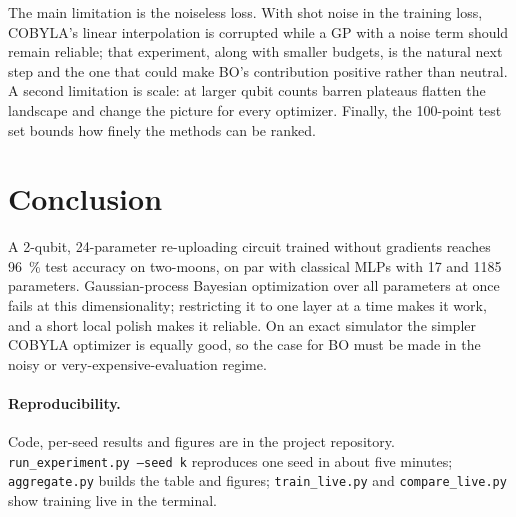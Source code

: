 \documentclass[10pt,twocolumn]{article}
\begin{document}
The main limitation is the noiseless loss. With shot noise in the training loss,
COBYLA's linear interpolation is corrupted while a GP with a noise term should remain
reliable; that experiment, along with smaller budgets, is the natural next step and
the one that could make BO's contribution positive rather than neutral. A second
limitation is scale: at larger qubit counts barren plateaus
\citep{mcclean2018barren} flatten the landscape and change the picture for every
optimizer. Finally, the 100-point test set bounds how finely the methods can be
ranked.

\section{Conclusion}

A 2-qubit, 24-parameter re-uploading circuit trained without gradients reaches
\SI{96}{\percent} test accuracy on two-moons, on par with classical MLPs with 17 and
1185 parameters. Gaussian-process Bayesian optimization over all parameters at once
fails at this dimensionality; restricting it to one layer at a time makes it work,
and a short local polish makes it reliable. On an exact simulator the simpler
COBYLA optimizer is equally good, so the case for BO must be made in the noisy or
very-expensive-evaluation regime.

\paragraph{Reproducibility.} Code, per-seed results and figures are in the project
repository. \texttt{run\_experiment.py --seed k} reproduces one seed in about five
minutes; \texttt{aggregate.py} builds the table and figures; \texttt{train\_live.py}
and \texttt{compare\_live.py} show training live in the terminal.



\end{document}
